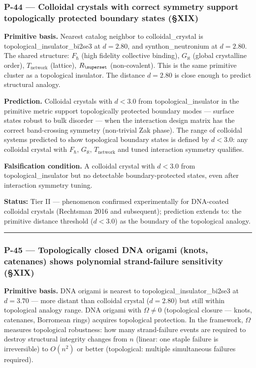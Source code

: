 \documentclass[12pt,a4paper]{article}
\begin{document}
\subsubsection{P-44 --- Colloidal crystals with correct symmetry support topologically protected boundary states (§XIX)}

\textbf{Primitive basis.} Nearest catalog neighbor to colloidal\_crystal is topological\_insulator\_bi2se3 at $d = 2.80$, and synthon\_neutronium at $d = 2.80$. The shared structure: $F_\hbar$ (high fidelity collective binding), $G_\aleph$ (global crystalline order), $T_\text{network}$ (lattice), $R_\superset$ (non-covalent). This is the same primitive cluster as a topological insulator. The distance $d = 2.80$ is close enough to predict structural analogy.

\textbf{Prediction.} Colloidal crystals with $d < 3.0$ from topological\_insulator in the primitive metric support topologically protected boundary modes --- surface states robust to bulk disorder --- when the interaction design matrix has the correct band-crossing symmetry (non-trivial Zak phase). The range of colloidal systems predicted to show topological boundary states is defined by $d < 3.0$: any colloidal crystal with $F_\hbar$, $G_\aleph$, $T_\text{network}$ and tuned interaction symmetry qualifies.

\textbf{Falsification condition.} A colloidal crystal with $d < 3.0$ from topological\_insulator but no detectable boundary-protected states, even after interaction symmetry tuning.

\textbf{Status:} Tier II --- phenomenon confirmed experimentally for DNA-coated colloidal crystals (Rechtsman 2016 and subsequent); prediction extends to: the primitive distance threshold ($d < 3.0$) as the boundary of the topological analogy.

\begin{center}
\rule{0.5\textwidth}{0.4pt}
\end{center}

\subsubsection{P-45 --- Topologically closed DNA origami (knots, catenanes) shows polynomial strand-failure sensitivity (§XIX)}

\textbf{Primitive basis.} DNA origami is nearest to topological\_insulator\_bi2se3 at $d = 3.70$ --- more distant than colloidal crystal ($d = 2.80$) but still within topological analogy range. DNA origami with $\Omega \neq 0$ (topological closure --- knots, catenanes, Borromean rings) acquires topological protection. In the framework, $\Omega$ measures topological robustness: how many strand-failure events are required to destroy structural integrity changes from $n$ (linear: one staple failure is irreversible) to $O(n^2)$ or better (topological: multiple simultaneous failures required).
\end{document}
